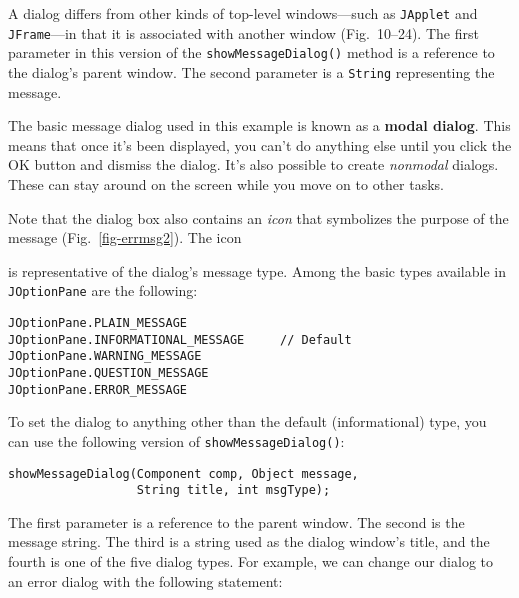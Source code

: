 A dialog differs from other kinds of top-level windows---such as
{\tt JApplet} and {\tt JFrame}---in that it is associated with
another window (Fig.~10\mbox{--}24).  The first parameter in this
version of the {\tt showMessageDialog()} method is a reference to the
dialog's parent window.  The second parameter is a {\tt String}
representing the message.

The basic message dialog used in this example is known as a
{\bf modal dialog}. This means that once it's been displayed, you
can't do anything else until you click the OK button and
dismiss the dialog.  It's also possible to create {\it nonmodal}
dialogs.  These can stay around on the screen while you move on to
other tasks.

Note that the dialog box also contains an {\it icon} that symbolizes
the purpose of the message (Fig.~\ref{fig-errmsg2}). The icon
\begin{figure}[h]
\end{figure}
is representative of the dialog's message type.  Among the basic
types available in {\tt JOptionPane} are the following:

\begin{jjjlisting}
\begin{lstlisting}
JOptionPane.PLAIN_MESSAGE
JOptionPane.INFORMATIONAL_MESSAGE     // Default
JOptionPane.WARNING_MESSAGE
JOptionPane.QUESTION_MESSAGE
JOptionPane.ERROR_MESSAGE
\end{lstlisting}
\end{jjjlisting}

\noindent To set the dialog to anything other than the default
(informational) type, you can use the following version of
{\tt showMessageDialog()}:

\begin{jjjlisting}
\begin{lstlisting}
showMessageDialog(Component comp, Object message, 
                  String title, int msgType);
\end{lstlisting}
\end{jjjlisting}

\noindent The first parameter is a reference to the parent window.
The second is the message string.  The third is a string used as the
dialog window's title, and the fourth is one of the five dialog types.
For example, we can change our dialog to an error dialog with the
following statement:



